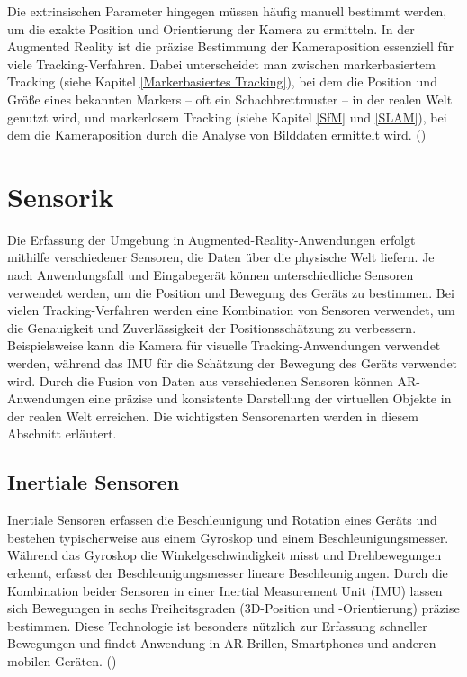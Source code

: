 Die extrinsischen Parameter hingegen müssen häufig manuell bestimmt werden, um die exakte Position und Orientierung der Kamera zu ermitteln. In der Augmented Reality ist die präzise Bestimmung der Kameraposition essenziell für viele Tracking-Verfahren. Dabei unterscheidet man zwischen markerbasiertem Tracking (siehe Kapitel \ref{Markerbasiertes Tracking}), bei dem die Position und Größe eines bekannten Markers – oft ein Schachbrettmuster – in der realen Welt genutzt wird, und markerlosem Tracking (siehe Kapitel \ref{SfM} und \ref{SLAM}), bei dem die Kameraposition durch die Analyse von Bilddaten ermittelt wird. (\cite{doerner2022virtual, alam2024calibration})

\section{Sensorik}

Die Erfassung der Umgebung in Augmented-Reality-Anwendungen erfolgt mithilfe verschiedener Sensoren, die Daten über die physische Welt liefern. Je nach Anwendungsfall und Eingabegerät können unterschiedliche Sensoren verwendet werden, um die Position und Bewegung des Geräts zu bestimmen. Bei vielen Tracking-Verfahren werden eine Kombination von Sensoren verwendet, um die Genauigkeit und Zuverlässigkeit der Positionsschätzung zu verbessern. Beispielsweise kann die Kamera für visuelle Tracking-Anwendungen verwendet werden, während das IMU für die Schätzung der Bewegung des Geräts verwendet wird. Durch die Fusion von Daten aus verschiedenen Sensoren können AR-Anwendungen eine präzise und konsistente Darstellung der virtuellen Objekte in der realen Welt erreichen. Die wichtigsten Sensorenarten werden in diesem Abschnitt erläutert.

\subsection{Inertiale Sensoren}

Inertiale Sensoren erfassen die Beschleunigung und Rotation eines Geräts und bestehen typischerweise aus einem Gyroskop und einem Beschleunigungsmesser. Während das Gyroskop die Winkelgeschwindigkeit misst und Drehbewegungen erkennt, erfasst der Beschleunigungsmesser lineare Beschleunigungen. Durch die Kombination beider Sensoren in einer Inertial Measurement Unit (IMU) lassen sich Bewegungen in sechs Freiheitsgraden (3D-Position und -Orientierung) präzise bestimmen. Diese Technologie ist besonders nützlich zur Erfassung schneller Bewegungen und findet Anwendung in AR-Brillen, Smartphones und anderen mobilen Geräten. (\cite{doerner2022virtual})

